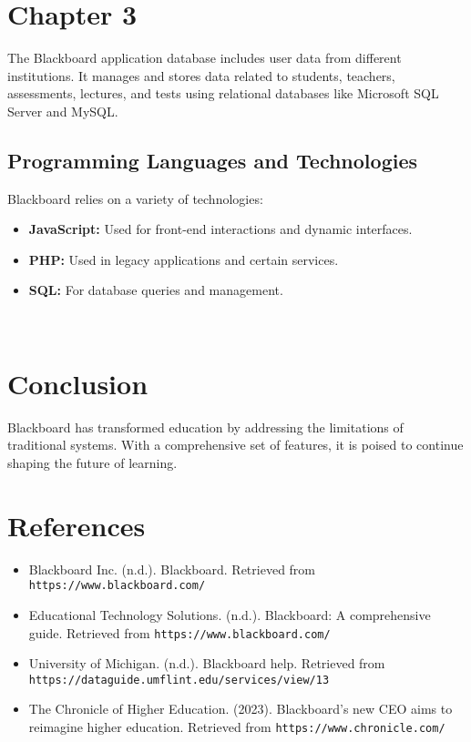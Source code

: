 \documentclass[12pt]{article}
\begin{document}
	\section{Chapter 3}
	
	The Blackboard application database includes user data from different institutions. It manages and stores data related to students, teachers, assessments, lectures, and tests using relational databases like Microsoft SQL Server and MySQL. 
	
	\subsection{Programming Languages and Technologies}
	Blackboard relies on a variety of technologies:
	\begin{itemize}
		\item \textbf{JavaScript:} Used for front-end interactions and dynamic interfaces.
		\item \textbf{PHP:} Used in legacy applications and certain services.
		\item \textbf{SQL:} For database queries and management.
	\end{itemize}
	
	
	
	
	
	
	
	
	
	
	
	
	
	
	
	
	
	
	
		\newpage\
		
	
	\section{Conclusion}
	Blackboard has transformed education by addressing the limitations of traditional systems. With a comprehensive set of features, it is poised to continue shaping the future of learning.
	
	\section{References}
	\begin{itemize}
		\item Blackboard Inc. (n.d.). Blackboard. Retrieved from \texttt{https://www.blackboard.com/}
		\item Educational Technology Solutions. (n.d.). Blackboard: A comprehensive guide. Retrieved from \texttt{https://www.blackboard.com/}
		\item University of Michigan. (n.d.). Blackboard help. Retrieved from \texttt{https://dataguide.umflint.edu/services/view/13}
		\item The Chronicle of Higher Education. (2023). Blackboard's new CEO aims to reimagine higher education. Retrieved from \texttt{https://www.chronicle.com/}
	\end{itemize}
	
\end{document}

